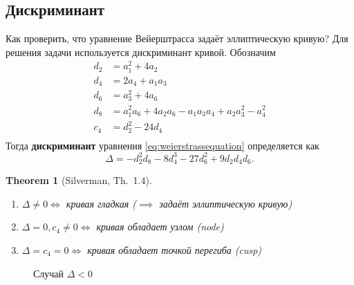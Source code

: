 \documentclass[11pt]{exam}
\newtheorem{theorem}{Theorem}[section]
\theoremstyle{definition}
\begin{document}
{\subsection{Дискриминант}
Как проверить, что уравнение Вейерштрасса задаёт эллиптическую кривую? Для решения задачи используется дискриминант кривой. Обозначим
\begin{equation}
	\begin{split}
		d_2 &= a_1^2 + 4a_2 \\
		d_4 &= 2a_4 + a_1a_3 \\
		d_6 &= a_3^2 + 4a_6 \\
		d_8 &= a_1^2a_6 + 4a_2a_6 - a_1a_3a_4 + a_2a_3^2 - a_4^2 \\
		c_4 &= d_2^2 - 24d_4 \\
	\end{split}
\end{equation}
Тогда \textbf{дискриминант} уравнения \eqref{eq:weierstrassequation} определяется как 
\[
\Delta = -d_2^2d_8 - 8d_4^3-27d_6^2+9d_2d_4d_6.
\]

\begin{theorem}[Silverman, Th.~1.4]
~
\begin{enumerate}
	\item $\Delta \neq 0 \iff$ кривая гладкая ($\implies$ задаёт эллиптическую кривую) 
	\item $\Delta = 0, c_4 \neq 0 \iff$ кривая обладает узлом (node) 
	\item $\Delta = c_4 = 0 \iff$ кривая обладает точкой перегиба (cusp)
\end{enumerate}
\end{theorem}

	\begin{figure}[h!]
		\caption{Случай $\Delta < 0$}
	\end{figure}

}
\end{document}
